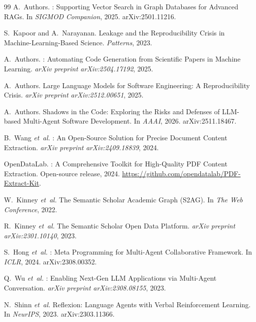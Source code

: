 \documentclass{article}
\begin{document}
\begin{thebibliography}{99}
A.~Authors.
: Supporting Vector Search in Graph Databases for Advanced {RAGs}.
\newblock In \emph{SIGMOD Companion}, 2025.
\newblock arXiv:2501.11216.

S.~Kapoor and A.~Narayanan.
\newblock Leakage and the Reproducibility Crisis in Machine-Learning-Based Science.
\newblock \emph{Patterns}, 2023.

A.~Authors.
: Automating Code Generation from Scientific Papers in Machine Learning.
\newblock \emph{arXiv preprint arXiv:2504.17192}, 2025.

A.~Authors.
\newblock Large Language Models for Software Engineering: A Reproducibility Crisis.
\newblock \emph{arXiv preprint arXiv:2512.00651}, 2025.

A.~Authors.
\newblock Shadows in the Code: Exploring the Risks and Defenses of {LLM-based} Multi-Agent Software Development.
\newblock In \emph{AAAI}, 2026.
\newblock arXiv:2511.18467.

B.~Wang \emph{et~al.}
: An Open-Source Solution for Precise Document Content Extraction.
\newblock \emph{arXiv preprint arXiv:2409.18839}, 2024.

{OpenDataLab}.
: A Comprehensive Toolkit for High-Quality {PDF} Content Extraction.
\newblock Open-source release, 2024.
\newblock \url{https://github.com/opendatalab/PDF-Extract-Kit}.

W.~Kinney \emph{et~al.}
\newblock The {Semantic Scholar} Academic Graph (S2AG).
\newblock In \emph{The Web Conference}, 2022.

R.~Kinney \emph{et~al.}
\newblock The {Semantic Scholar} Open Data Platform.
\newblock \emph{arXiv preprint arXiv:2301.10140}, 2023.

S.~Hong \emph{et~al.}
: Meta Programming for Multi-Agent Collaborative Framework.
\newblock In \emph{ICLR}, 2024.
\newblock arXiv:2308.00352.

Q.~Wu \emph{et~al.}
: Enabling Next-Gen {LLM} Applications via Multi-Agent Conversation.
\newblock \emph{arXiv preprint arXiv:2308.08155}, 2023.

N.~Shinn \emph{et~al.}
\newblock Reflexion: Language Agents with Verbal Reinforcement Learning.
\newblock In \emph{NeurIPS}, 2023.
\newblock arXiv:2303.11366.


\end{thebibliography}
\end{document}
